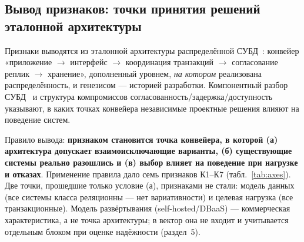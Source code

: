 \documentclass{misisarticle}
\begin{document}
\subsection{Вывод признаков: точки принятия решений эталонной архитектуры}

Признаки выводятся из эталонной архитектуры распределённой СУБД~\cite{ozsu,cattell}: конвейер «приложение $\to$ интерфейс $\to$ координация транзакций $\to$ согласование реплик $\to$ хранение», дополненный уровнем, \emph{на котором} реализована распределённость, и генезисом --- историей разработки. Компонентный разбор СУБД~\cite{endofera} и структура компромиссов согласованность/задержка/доступность~\cite{abadi,bailis} указывают, в каких точках конвейера независимые проектные решения влияют на поведение систем.

Правило вывода: \textbf{признаком становится точка конвейера, в которой (а) архитектура допускает взаимоисключающие варианты, (б) существующие системы реально разошлись и (в) выбор влияет на поведение при нагрузке и отказах}. Применение правила дало семь признаков К1--К7 (табл.~\ref{tab:axes}). Две точки, прошедшие только условие (а), признаками не стали: модель данных (все системы класса реляционны --- нет вариативности) и целевая нагрузка (все транзакционные). Модель развёртывания (self-hosted/DBaaS) --- коммерческая характеристика, а не точка архитектуры; в вектор она не входит и учитывается отдельным блоком при оценке надёжности (раздел~5).
\end{document}
